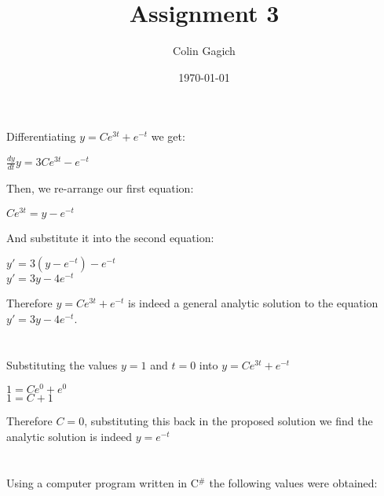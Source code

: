 \documentclass[]{article}
\title{Assignment 3}
\author{Colin Gagich}
\date{\today}
\begin{document}
\maketitle

\section{}

Differentiating $y = C e^{3t} + e^{-t}$ we get:

\begin{center}
$\frac{dy}{dt} y = 3 C e^{3t} - e^{-t}$
\end{center}

Then, we re-arrange our first equation:

\begin{center}
$C e^{3t} = y - e^{-t}$
\end{center}

And substitute it into the second equation:

\begin{center}
$y' = 3 (y - e^{-t}) - e^{-t}$ \\
$y' = 3 y - 4 e^{-t}$\\
\end{center}

\noindent Therefore $y = C e^{3t} + e^{-t}$ is indeed a general analytic solution to the equation $y' = 3 y - 4 e^{-t}$.

\section{}

Substituting the values $y = 1$ and $t = 0$ into $y = C e^{3t} + e^{-t}$

\begin{center}
$1 = C e^{0} + e^{0}$ \\
$1 = C + 1$ \\
\end{center}

\noindent Therefore $C = 0$, substituting this back in the proposed solution we find the analytic solution is indeed $y = e^{-t}$

\section{}

Using a computer program written in C$^{\#}$ the following values were obtained:
\end{document}
